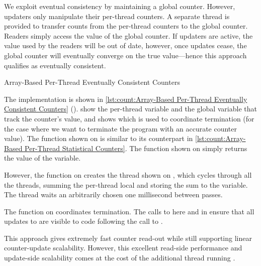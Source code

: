We exploit eventual consistency by maintaining a global counter.
However, updaters only manipulate their per-thread counters.
A separate thread is provided to transfer counts from the per-thread
counters to the global counter.
Readers simply access the value of the global counter.
If updaters are active, the value used by the readers will be out of
date, however, once updates cease, the global counter will eventually
converge on the true value---hence this approach qualifies as
eventually consistent.

\begin{listing}
\caption{Array-Based Per-Thread Eventually Consistent Counters}
\label{lst:count:Array-Based Per-Thread Eventually Consistent Counters}
\end{listing}

\begin{fcvref}
The implementation is shown in
\cref{lst:count:Array-Based Per-Thread Eventually Consistent Counters}
().
show the per-thread variable and the global variable that
track the counter's value, and  shows 
which is used to coordinate termination (for the case where we want
to terminate the program with an accurate counter value).
The  function shown on
 is similar to its
counterpart in
\cref{lst:count:Array-Based Per-Thread Statistical Counters}.
The  function shown on
 simply returns the
value of the  variable.

However, the  function on
creates the  thread shown on
, which
cycles through all the threads,
summing the per-thread local  and storing the
sum to the  variable.
The  thread waits an arbitrarily chosen one millisecond
between passes.

The  function on
 coordinates termination.
The calls to  here and in  ensure
that all updates to  are visible to code following
the call to .

This approach gives extremely fast counter read-out while still
supporting linear counter-update scalability.
However, this excellent read-side performance and update-side scalability
comes at the cost of the additional thread running .
\end{fcvref}

